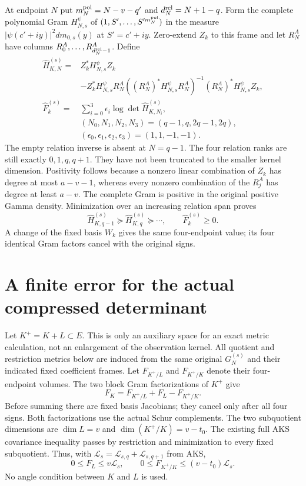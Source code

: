 \documentclass[11pt,a4paper]{article}
\begin{document}
At endpoint $N$ put $m_N^{\rm pol}=N-v-q'$ and $d_N^{\rm rel}=N+1-q$.
Form the complete polynomial Gram $H_{N,s}^{\psi}$ of
$(1,S',\ldots,S'^{m_N^{\rm pol}})$ in the measure
$|\psi(c'+iy)|^2dm_{0,s}(y)$ at $S'=c'+iy$. Zero-extend $Z_k$ to this
frame and let $R_N^A$ have columns $R_0^A,\ldots,R_{d_N^{\rm rel}-1}^A$.
Define
\[
\begin{split}
 \widehat H_{K,N}^{(s)}={}&Z_k^*H_{N,s}^{\psi}Z_k\\
 &-Z_k^*H_{N,s}^{\psi}R_N^A
    ((R_N^A)^*H_{N,s}^{\psi}R_N^A)^{-1}
                (R_N^A)^*H_{N,s}^{\psi}Z_k,\\
 \widehat F_k^{(s)}={}&
 \sum_{i=0}^3\epsilon_i\log\det\widehat H_{K,N_i}^{(s)},\\
 & (N_0,N_1,N_2,N_3)=(q-1,q,2q-1,2q),\\
 & (\epsilon_0,\epsilon_1,\epsilon_2,\epsilon_3)=(1,1,-1,-1).
\end{split}\tag{FEX29}
\]
The empty relation inverse is absent at $N=q-1$. The four relation
ranks are still exactly $0,1,q,q+1$. They have not been truncated to the
smaller kernel dimension. Positivity follows because a nonzero linear
combination of $Z_k$ has degree at most $a-v-1$, whereas every nonzero
combination of the $R_j^A$ has degree at least $a-v$. The complete Gram
is positive in the original positive Gamma density. Minimization over
an increasing relation span proves
\[
 \widehat H_{K,q-1}^{(s)}\succeq\widehat H_{K,q}^{(s)}
 \succeq\cdots,\qquad \widehat F_k^{(s)}\ge0.
 \tag{FEX30}
\]
A change of the fixed basis $W_k$ gives the same four-endpoint value;
its four identical Gram factors cancel with the original signs.

\section{A finite error for the actual compressed determinant}
\label{sec:FEX-error}
Let $K^+=K+L\subset E$. This is only an auxiliary space for an exact
metric calculation, not an enlargement of the observation kernel.
All quotient and restriction metrics below are induced from the same
original $G_N^{(s)}$ and their indicated fixed coefficient frames.
Let $F_{K^+/L}$ and $F_{K^+/K}$ denote their four-endpoint volumes.
The two block Gram factorizations of $K^+$ give
\[
 \boxed{\qquad F_K=F_{K^+/L}+F_L-F_{K^+/K}.\qquad}
 \tag{FEX31}
\]
Before summing there are fixed basis Jacobians; they cancel only after
all four signs. Both factorizations use the actual Schur complements.
The two subquotient dimensions are $\dim L=v$ and
$\dim(K^+/K)=v-t_0$. The existing full AKS covariance inequality passes
by restriction and minimization to every fixed subquotient. Thus, with
$\mathcal L_s=\mathcal L_{s,q}+\mathcal L_{s,q+1}$ from AKS,
\[
 0\le F_L\le v\mathcal L_s,\qquad
 0\le F_{K^+/K}\le(v-t_0)\mathcal L_s.
 \tag{FEX32}
\]
No angle condition between $K$ and $L$ is used.
\end{document}
